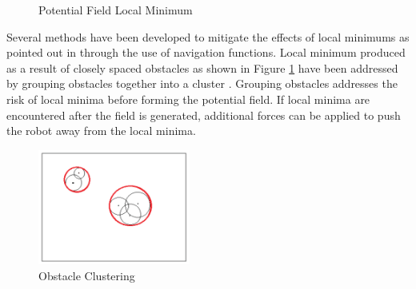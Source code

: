 \documentclass[numbered,pdftex]{ohio-etd}
\begin{document}
\begin{figure}[h]
	\begin{subfigmatrix}{2}%
		\centering
	\end{subfigmatrix}
	\caption{Potential Field Local Minimum \cite{liu_virtual-waypoint_2016}}
	\label{fig:pfLocalMin}
\end{figure}

Several methods have been developed to mitigate the effects of local minimums as pointed out in \cite{goerzen_survey_2010} through the use of navigation functions. Local minimum produced as a result of closely spaced obstacles as shown in Figure \ref{fig:pfLocalMin} have been addressed by grouping obstacles together into a cluster \cite{liu_virtual-waypoint_2016}. Grouping obstacles addresses the risk of local minima before forming the potential field. If local minima are encountered after the field is generated, additional forces can be applied to push the robot away from the local minima. 

\begin{figure}[H]
	\centering
	\includegraphics[width=5cm]{PaperFigures/obstacleClustering}
	\caption{Obstacle Clustering \cite{liu_virtual-waypoint_2016}}
	\label{fig:obstacleclustering}
\end{figure}
\end{document}
